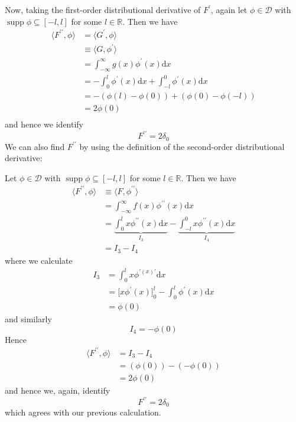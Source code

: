 \documentclass{article}
\DeclareMathOperator\supp{supp}
\begin{document}
Now, taking the first-order distributional derivative of $F^\prime$,
again let $\phi \in \mathcal{D}$ with $\supp \phi \subseteq [-l, l]$ for
some $l \in \mathbb{R}$. Then we have
%
\begin{align*}
    \langle F^{\prime \prime}, \phi \rangle
        &= \langle G^\prime, \phi \rangle \\
        &\equiv \langle G, \phi^\prime \rangle \\
        &= \int_{- \infty}^{\infty} g(x) \phi^\prime(x) \mathrm{d} x \\
        &= - \int_{0}^{l} \phi^\prime(x) \mathrm{d} x
            + \int_{-l}^{0} \phi^\prime(x) \mathrm{d} x \\
        &= - \left( \phi(l) - \phi(0) \right) + \left( \phi(0) - \phi(-l) \right) \\
        &= 2 \phi(0) \\
\end{align*}
%
and hence we identify
%
\begin{equation*}
    F^{\prime \prime} = 2 \delta_0
\end{equation*}
%
We can also find $F^{\prime \prime}$ by using the definition of the
second-order distributional derivative:

Let $\phi \in \mathcal{D}$ with $\supp \phi \subseteq [-l, l]$ for some
$l \in \mathbb{R}$. Then we have
%
\begin{align*}
    \langle F^{\prime \prime}, \phi \rangle
        &\equiv \langle F, \phi^{\prime \prime} \rangle \\
        &= \int_{- \infty}^{\infty} f(x) \phi^{\prime \prime}(x) \mathrm{d} x \\
        &= \underbrace{\int_{0}^{l} x \phi^{\prime \prime}(x) \mathrm{d} x}_{I_3}
            - \underbrace{\int_{-l}^{0} x \phi^{\prime \prime}(x) \mathrm{d} x}_{I_4} \\
        &= I_3 - I_4
\end{align*}
%
where we calculate
%
\begin{align*}
    I_3 &= \int_{0}^{l} x \phi^{\prime(x) \prime} \mathrm{d} x \\
        &= \big[ x \phi^\prime(x) \big]_{0}^{l} - \int_{0}^{l} \phi^\prime(x) \mathrm{d} x \\
        &= \phi(0)
\end{align*}
%
and similarly
%
\begin{equation*}
    I_4 = - \phi(0)
\end{equation*}
%
Hence
%
\begin{align*}
    \langle F^{\prime \prime}, \phi \rangle
        &= I_3 - I_4 \\
        &= (\phi(0)) - (- \phi(0)) \\
        &= 2 \phi(0)
\end{align*}
%
and hence we, again, identify
%
\begin{equation*}
    F^{\prime \prime} = 2 \delta_0
\end{equation*}
%
which agrees with our previous calculation.
\end{document}
